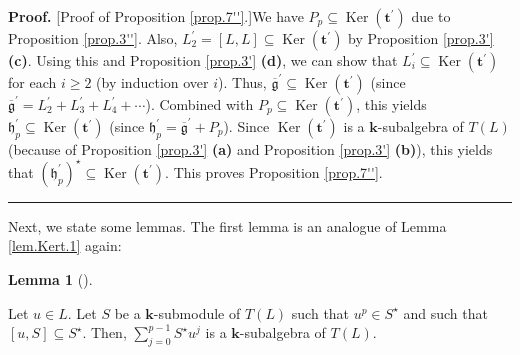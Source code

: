 \documentclass[numbers=enddot,12pt,final,onecolumn,notitlepage]{scrartcl}%
\theoremstyle{definition}
\newtheorem{lem}[theo]{Lemma}
\newenvironment{lemma}[1][]
{\begin{lem}[#1]\begin{leftbar}}
{\end{leftbar}\end{lem}}
\newenvironment{proof}[1][Proof]{\noindent\textbf{#1.} }{\ \rule{0.5em}{0.5em}}
\let\sumnonlimits\sum
\renewcommand{\sum}{\sumnonlimits\limits}
\begin{document}
\begin{proof}
[Proof of Proposition \ref{prop.7''}.]We have $P_{p}\subseteq
\operatorname*{Ker}\left(  \mathbf{t}^{\prime}\right)  $ due to Proposition
\ref{prop.3''}. Also, $L_{2}^{\prime}=\left[  L,L\right]  \subseteq
\operatorname*{Ker}\left(  \mathbf{t}^{\prime}\right)  $ by Proposition
\ref{prop.3'} \textbf{(c)}. Using this and Proposition \ref{prop.3'}
\textbf{(d)}, we can show that $L_{i}^{\prime}\subseteq\operatorname*{Ker}%
\left(  \mathbf{t}^{\prime}\right)  $ for each $i\geq2$ (by induction over
$i$). Thus, $\overline{\mathfrak{g}}^{\prime}\subseteq\operatorname*{Ker}%
\left(  \mathbf{t}^{\prime}\right)  $ (since $\overline{\mathfrak{g}}^{\prime
}=L_{2}^{\prime}+L_{3}^{\prime}+L_{4}^{\prime}+\cdots$). Combined with
$P_{p}\subseteq\operatorname*{Ker}\left(  \mathbf{t}^{\prime}\right)  $, this
yields $\mathfrak{h}_{p}^{\prime}\subseteq\operatorname*{Ker}\left(
\mathbf{t}^{\prime}\right)  $ (since $\mathfrak{h}_{p}^{\prime}=\overline
{\mathfrak{g}}^{\prime}+P_{p}$). Since $\operatorname*{Ker}\left(
\mathbf{t}^{\prime}\right)  $ is a $\mathbf{k}$-subalgebra of $T\left(
L\right)  $ (because of Proposition \ref{prop.3'} \textbf{(a)} and Proposition
\ref{prop.3'} \textbf{(b)}), this yields that $\left(  \mathfrak{h}%
_{p}^{\prime}\right)  ^{\star}\subseteq\operatorname*{Ker}\left(
\mathbf{t}^{\prime}\right)  $. This proves Proposition \ref{prop.7''}.
\end{proof}

Next, we state some lemmas. The first lemma is an analogue of Lemma
\ref{lem.Kert.1} again:

\begin{lemma}
\label{lem.Kert''.1}Let $u\in L$. Let $S$ be a $\mathbf{k}$-submodule of
$T\left(  L\right)  $ such that $u^{p}\in S^{\star}$ and such that $\left[
u,S\right]  \subseteq S^{\star}$. Then, $\sum_{j=0}^{p-1}S^{\star}u^{j}$ is a
$\mathbf{k}$-subalgebra of $T\left(  L\right)  $.
\end{lemma}
\end{document}
